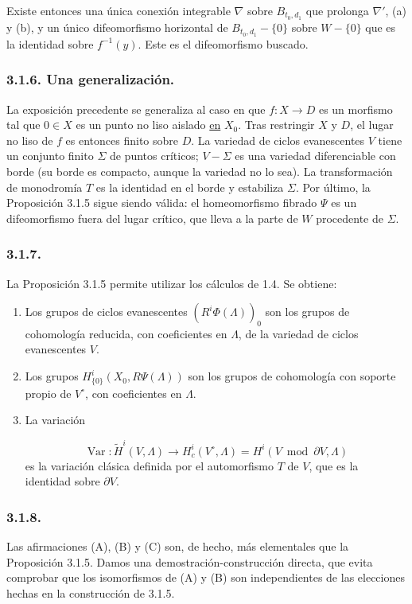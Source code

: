 Existe entonces una única conexión integrable $\nabla$ sobre
$B_{t_0,d_1}$ que prolonga $\nabla'$, (a) y (b), y un único
difeomorfismo horizontal de $B_{t_0,d_1}-\{0\}$ sobre $W-\{0\}$ que
es la identidad sobre $f^{-1}(y)$. Este es el difeomorfismo buscado.

\subsubsection*{3.1.6. Una generalización.}
La exposición precedente se generaliza al caso en que $f:X\to D$ es
un morfismo tal que $0\in X$ es un punto no liso aislado \underline{en}
$X_0$. Tras restringir $X$ y $D$, el lugar no liso de $f$ es entonces
finito sobre $D$. La variedad de ciclos evanescentes $V$ tiene un
conjunto finito $\Sigma$ de puntos críticos; $V-\Sigma$ es una variedad
diferenciable con borde (su borde es compacto, aunque la variedad no lo
sea). La transformación de monodromía $T$ es la identidad en el borde y
estabiliza $\Sigma$. Por último, la Proposición 3.1.5 sigue siendo
válida: el homeomorfismo fibrado $\Psi$ es un difeomorfismo fuera del
lugar crítico, que lleva a la parte de $W$ procedente de $\Sigma$.

\subsubsection*{3.1.7.}
La Proposición 3.1.5 permite utilizar los cálculos de 1.4. Se obtiene:

\begin{enumerate}[label=(\Alph*)]
\item Los grupos de ciclos evanescentes $(R^i\Phi(\Lambda))_0$ son los
  grupos de cohomología reducida, con coeficientes en $\Lambda$, de la
  variedad de ciclos evanescentes $V$.
\item Los grupos $H^i_{\{0\}}(X_0,R\Psi(\Lambda))$ son los grupos de
  cohomología con soporte propio de $V^\circ$, con coeficientes en
  $\Lambda$.
\item La variación

  \pageoriginale

  \[
  \operatorname{Var}:\widetilde H^i(V,\Lambda)
  \longrightarrow H_c^i(V^\circ,\Lambda)
  =H^i(V\bmod\partial V,\Lambda)
  \]
  es la variación clásica definida por el automorfismo $T$ de $V$,
  que es la identidad sobre $\partial V$.
\end{enumerate}

\subsubsection*{3.1.8.}
Las afirmaciones (A), (B) y (C) son, de hecho, más elementales que la
Proposición 3.1.5. Damos una demostración-construcción directa, que evita
comprobar que los isomorfismos de (A) y (B) son independientes de las
elecciones hechas en la construcción de 3.1.5.

